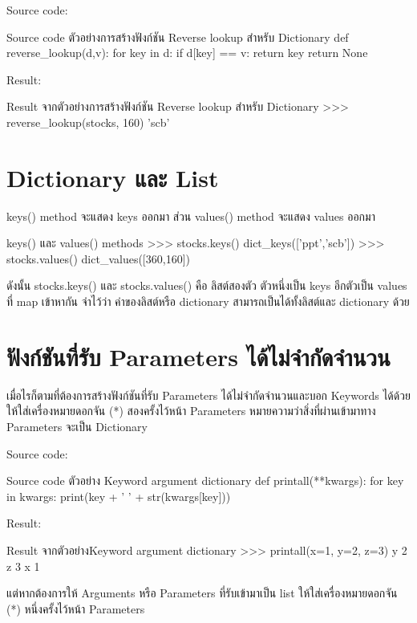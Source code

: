 Source code:
\begin{codelist}{Source code ตัวอย่างการสร้างฟังก์ชัน Reverse lookup สำหรับ Dictionary}{}
def reverse_lookup(d,v):
    for key in d:
        if d[key] == v: return key
    return None
\end{codelist}

Result:
\begin{codelist}{Result จากตัวอย่างการสร้างฟังก์ชัน Reverse lookup สำหรับ Dictionary}{}
>>> reverse_lookup(stocks, 160)
'scb'
\end{codelist}


\section{Dictionary และ List}

keys() method จะแสดง keys ออกมา ส่วน values() method จะแสดง values ออกมา 

\begin{codelist}{keys() และ values() methods}{}
>>> stocks.keys()
dict_keys(['ppt','scb'])
>>> stocks.values()
dict_values([360,160])
\end{codelist}


ดังนั้น stocks.keys() และ stocks.values() คือ ลิสต์สองตัว ตัวหนึ่งเป็น keys อีกตัวเป็น values ที่ map เข้าหากัน จำไว้ว่า ค่าของลิสต์หรือ dictionary สามารถเป็นได้ทั้งลิสต์และ dictionary ด้วย

\section{ฟังก์ชันที่รับ Parameters ได้ไม่จำกัดจำนวน }

เมื่อไรก็ตามที่ต้องการสร้างฟังก์ชันที่รับ Parameters ได้ไม่จำกัดจำนวนและบอก Keywords ได้ด้วย ให้ใส่เครื่องหมายดอกจัน (*) สองครั้งไว้หน้า Parameters หมายความว่าสิ่งที่ผ่านเข้ามาทาง Parameters จะเป็น Dictionary 

Source code:
\begin{codelist}{Source code ตัวอย่าง Keyword argument dictionary}{}
def printall(**kwargs):
    for key in kwargs:
        print(key + ' ' + str(kwargs[key]))
\end{codelist}
Result:
\begin{codelist}{Result จากตัวอย่างKeyword argument dictionary}{}
>>> printall(x=1, y=2, z=3)
y 2
z 3
x 1
\end{codelist}

แต่หากต้องการให้ Arguments หรือ Parameters ที่รับเข้ามาเป็น list ให้ใส่เครื่องหมายดอกจัน (*) หนึ่งครั้งไว้หน้า Parameters 

